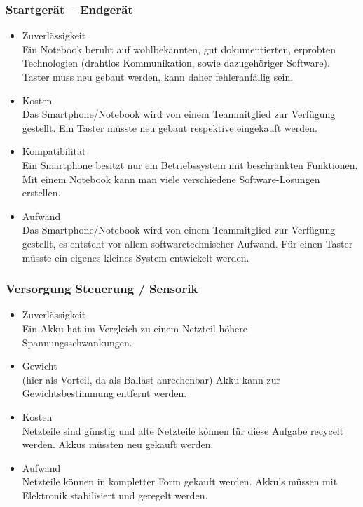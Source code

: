 		\subsubsection{Startgerät – Endgerät}
			\begin{itemize}
				\item Zuverlässigkeit\\
				Ein Notebook beruht auf wohlbekannten, gut dokumentierten, erprobten Technologien (drahtlos Kommunikation, sowie dazugehöriger Software). Taster muss neu gebaut werden, kann daher fehleranfällig sein.
				\item Kosten\\
				Das Smartphone/Notebook wird von einem Teammitglied zur Verfügung gestellt. Ein Taster müsste neu gebaut respektive eingekauft werden.
				\item Kompatibilität\\
				Ein Smartphone besitzt nur ein Betriebssystem mit beschränkten Funktionen. Mit einem Notebook kann man viele verschiedene Software-Lösungen erstellen.
				\item Aufwand\\
				Das Smartphone/Notebook wird von einem Teammitglied zur Verfügung gestellt, es entsteht vor allem softwaretechnischer Aufwand. Für einen Taster müsste ein eigenes kleines System entwickelt werden.
			\end{itemize}
			
		\subsubsection{Versorgung Steuerung / Sensorik}
			\begin{itemize}
				\item Zuverlässigkeit\\
				Ein Akku hat im Vergleich zu einem Netzteil höhere Spannungsschwankungen.
				\item Gewicht\\
				(hier als Vorteil, da als Ballast anrechenbar) Akku kann zur Gewichtsbestimmung entfernt werden.
				\item Kosten\\
				Netzteile sind günstig und alte Netzteile können für diese Aufgabe recycelt werden. Akkus müssten neu gekauft werden.
				\item Aufwand\\
				Netzteile können in kompletter Form gekauft werden. Akku’s müssen mit Elektronik stabilisiert und geregelt werden.
			\end{itemize}
			
